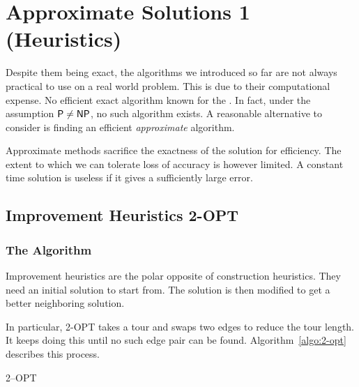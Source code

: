 \chapter{Approximate Solutions 1 (Heuristics)}

Despite them being exact, the algorithms we introduced so far are not always practical to use on a real world problem. This is due to their computational expense. No efficient exact algorithm known for the \TSP. In fact, under the assumption \(\textsf{P}\neq\textsf{NP}\), no such algorithm exists. A reasonable alternative to consider is finding an efficient \emph{approximate} algorithm.

Approximate methods sacrifice the exactness of the solution for efficiency. The extent to which we can tolerate loss of accuracy is however limited. A constant time solution is useless if it gives a sufficiently large error.





\section{Improvement Heuristics 2-OPT}

\subsection{The Algorithm}

Improvement heuristics are the polar opposite of construction heuristics. They need an initial solution to start from. The solution is then modified to get a better neighboring solution.

In particular, 2-OPT takes a tour and swaps two edges to reduce the tour length. It keeps doing this until no such edge pair can be found. Algorithm~\ref{algo:2-opt} describes this process.

\begin{algorithm}
    \caption{2--OPT}
    \label{algo:2-opt}


\end{algorithm}

